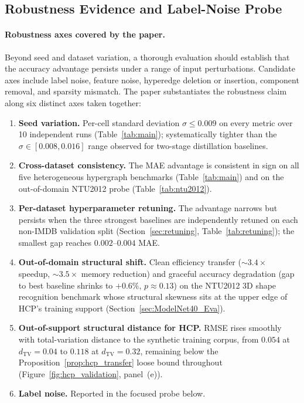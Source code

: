 \documentclass[10pt]{article}
\theoremstyle{plain}
\theoremstyle{definition}
\begin{document}
\subsection{Robustness Evidence and Label-Noise Probe}
\label{sec:robustness}

\paragraph{Robustness axes covered by the paper.} Beyond seed and dataset variation, a thorough evaluation should establish that the accuracy advantage persists under a range of input perturbations. Candidate axes include label noise, feature noise, hyperedge deletion or insertion, component removal, and sparsity mismatch. The paper substantiates the robustness claim along six distinct axes taken together:
\begin{enumerate}[label=(\roman*),leftmargin=*,itemsep=2pt,topsep=2pt]
\item \textbf{Seed variation.} Per-cell standard deviation $\sigma\!\leq\!0.009$ on every metric over 10 independent runs (Table~\ref{tab:main}); systematically tighter than the $\sigma\!\in\![0.008, 0.016]$ range observed for two-stage distillation baselines.
\item \textbf{Cross-dataset consistency.} The MAE advantage is consistent in sign on all five heterogeneous hypergraph benchmarks (Table~\ref{tab:main}) and on the out-of-domain NTU2012 probe (Table~\ref{tab:ntu2012}).
\item \textbf{Per-dataset hyperparameter retuning.} The advantage narrows but persists when the three strongest baselines are independently retuned on each non-IMDB validation split (Section~\ref{sec:retuning}, Table~\ref{tab:retuning}); the smallest gap reaches $0.002$--$0.004$ MAE.
\item \textbf{Out-of-domain structural shift.} Clean efficiency transfer ($\sim\!3.4\!\times$ speedup, $\sim\!3.5\!\times$ memory reduction) and graceful accuracy degradation (gap to best baseline shrinks to $+0.6\%$, $p\!\approx\!0.13$) on the NTU2012 3D shape recognition benchmark whose structural skewness sits at the upper edge of HCP's training support (Section~\ref{sec:ModelNet40_Eva}).
\item \textbf{Out-of-support structural distance for HCP.} RMSE rises smoothly with total-variation distance to the synthetic training corpus, from $0.054$ at $d_{\mathrm{TV}}\!=\!0.04$ to $0.118$ at $d_{\mathrm{TV}}\!=\!0.32$, remaining below the Proposition~\ref{prop:hcp_transfer} loose bound throughout (Figure~\ref{fig:hcp_validation}, panel~(e)).
\item \textbf{Label noise.} Reported in the focused probe below.
\end{enumerate}
\end{document}
